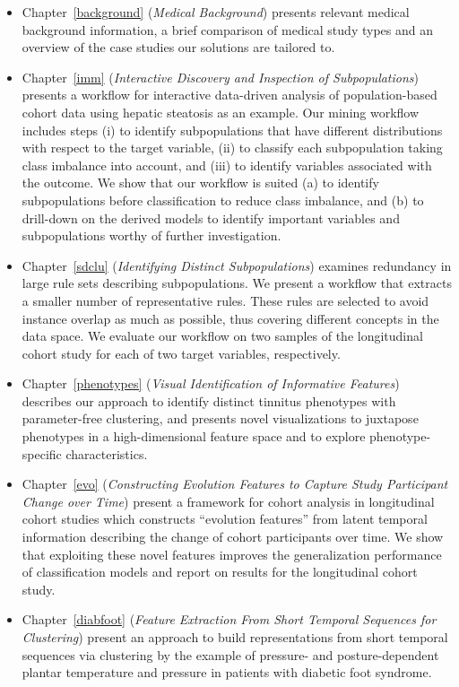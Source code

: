 \documentclass[
  oneside]{book}
\providecommand{\tightlist}{%
  \setlength{\itemsep}{0pt}\setlength{\parskip}{0pt}}
\begin{document}
\begin{itemize}
\tightlist
\item
  Chapter~\ref{background} (\emph{Medical Background}) presents relevant medical background information, a brief comparison of medical study types and an overview of the case studies our solutions are tailored to.
\item
  Chapter~\ref{imm} (\emph{Interactive Discovery and Inspection of Subpopulations}) presents a workflow for interactive data-driven analysis of population-based cohort data using hepatic steatosis as an example. Our mining workflow includes steps (i) to identify subpopulations that have different distributions with respect to the target variable, (ii) to classify each subpopulation taking class imbalance into account, and (iii) to identify variables associated with the outcome. We show that our workflow is suited (a) to identify subpopulations before classification to reduce class imbalance, and (b) to drill-down on the derived models to identify important variables and subpopulations worthy of further investigation.
\item
  Chapter~\ref{sdclu} (\emph{Identifying Distinct Subpopulations}) examines redundancy in large rule sets describing subpopulations. We present a workflow that extracts a smaller number of representative rules. These rules are selected to avoid instance overlap as much as possible, thus covering different concepts in the data space. We evaluate our workflow on two samples of the longitudinal cohort study for each of two target variables, respectively.
\item
  Chapter~\ref{phenotypes} (\emph{Visual Identification of Informative Features}) describes our approach to identify distinct tinnitus phenotypes with parameter-free clustering, and presents novel visualizations to juxtapose phenotypes in a high-dimensional feature space and to explore phenotype-specific characteristics.
\item
  Chapter~\ref{evo} (\emph{Constructing Evolution Features to Capture Study Participant Change over Time}) present a framework for cohort analysis in longitudinal cohort studies which constructs ``evolution features'' from latent temporal information describing the change of cohort participants over time. We show that exploiting these novel features improves the generalization performance of classification models and report on results for the longitudinal cohort study.
\item
  Chapter~\ref{diabfoot} (\emph{Feature Extraction From Short Temporal Sequences for Clustering}) present an approach to build representations from short temporal sequences via clustering by the example of pressure- and posture-dependent plantar temperature and pressure in patients with diabetic foot syndrome.

\end{itemize}
\end{document}
